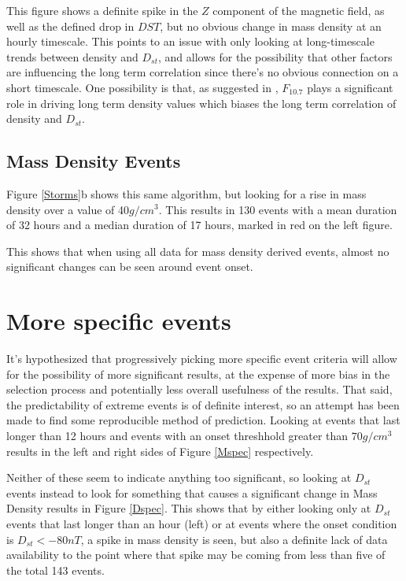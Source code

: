 \documentclass[10pt,twocolumn]{article}
\begin{document}
This figure shows a definite spike in the $Z$ component of the magnetic field, as well as the defined drop in $DST$, but no obvious change in mass density at an hourly timescale. This points to an issue with only looking at long-timescale trends between density and $D_{st}$, and allows for the possibility that other factors are influencing the long term correlation since there's no obvious connection on a short timescale. One possibility is that, as suggested in \cite{Takahashi2010}, $F_{10.7}$ plays a significant role in driving long term density values which biases the long term correlation of density and $D_{st}$.

\subsection{Mass Density Events}
Figure \ref{Storms}b shows this same algorithm, but looking for a rise in mass density over a value of 40$g/cm^3$. This results in 130 events with a mean duration of 32 hours and a median duration of 17 hours, marked in red on the left figure.

This shows that when using all data for mass density derived events, almost no significant changes can be seen around event onset.



\section{More specific events}
It's hypothesized that progressively picking more specific event criteria will allow for the possibility of more significant results, at the expense of more bias in the selection process and potentially less overall usefulness of the results. That said, the predictability of extreme events is of definite interest, so an attempt has been made to find some reproducible method of prediction. Looking at events that last longer than 12 hours and events with an onset threshhold greater than $70g/cm^3$ results in the left and right sides of Figure \ref{Mspec} respectively.



Neither of these seem to indicate anything too significant, so looking at $D_{st}$ events instead to look for something that causes a significant change in Mass Density results in Figure \ref{Dspec}. This shows that by either looking only at $D_{st}$ events that last longer than an hour (left) or at events where the onset condition is $D_{st}<-80nT$, a spike in mass density is seen, but also a definite lack of data availability to the point where that spike may be coming from less than five of the total 143 events. 
\end{document}

